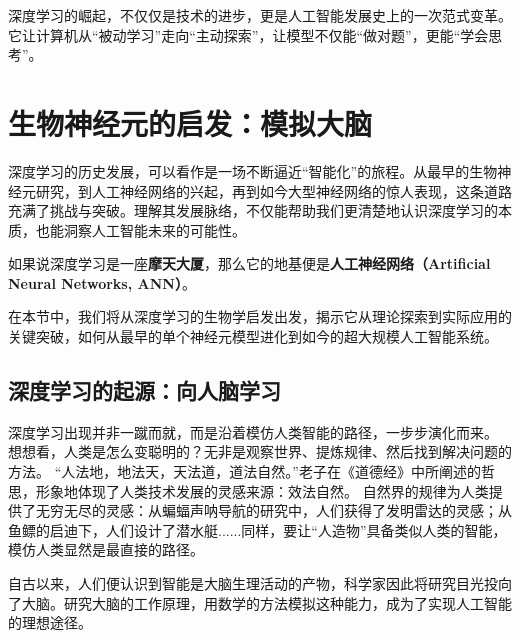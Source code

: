 深度学习的崛起，不仅仅是技术的进步，更是人工智能发展史上的一次范式变革。它让计算机从“被动学习”走向“主动探索”，让模型不仅能“做对题”，更能“学会思考”。

\section{生物神经元的启发：模拟大脑}
深度学习的历史发展，可以看作是一场不断逼近“智能化”的旅程。从最早的生物神经元研究，到人工神经网络的兴起，再到如今大型神经网络的惊人表现，这条道路充满了挑战与突破。理解其发展脉络，不仅能帮助我们更清楚地认识深度学习的本质，也能洞察人工智能未来的可能性。

如果说深度学习是一座{\bf 摩天大厦}，那么它的地基便是{\bf 人工神经网络（Artificial Neural Networks, ANN）}。

在本节中，我们将从深度学习的生物学启发出发，揭示它从理论探索到实际应用的关键突破，如何从最早的单个神经元模型进化到如今的超大规模人工智能系统。

\subsection{深度学习的起源：向人脑学习}
深度学习出现并非一蹴而就，而是沿着模仿人类智能的路径，一步步演化而来。
想想看，人类是怎么变聪明的？无非是观察世界、提炼规律、然后找到解决问题的方法。
“人法地，地法天，天法道，道法自然。”老子在《道德经》中所阐述的哲思，形象地体现了人类技术发展的灵感来源：效法自然。
自然界的规律为人类提供了无穷无尽的灵感：从蝙蝠声呐导航的研究中，人们获得了发明雷达的灵感；从鱼鳔的启迪下，人们设计了潜水艇......同样，要让“人造物”具备类似人类的智能，模仿人类显然是最直接的路径。

自古以来，人们便认识到智能是大脑生理活动的产物，科学家因此将研究目光投向了大脑。研究大脑的工作原理，用数学的方法模拟这种能力，成为了实现人工智能的理想途径。

